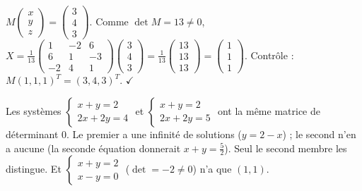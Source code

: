 \begin{exemple}
$M\begin{pmatrix}x\\y\\z\end{pmatrix}=\begin{pmatrix}3\\4\\3\end{pmatrix}$. Comme $\det M=13\ne0$, $X=\frac1{13}\begin{pmatrix}1&-2&6\\6&1&-3\\-2&4&1\end{pmatrix}\begin{pmatrix}3\\4\\3\end{pmatrix}=\frac1{13}\begin{pmatrix}13\\13\\13\end{pmatrix}=\begin{pmatrix}1\\1\\1\end{pmatrix}$. Contrôle : $M(1,1,1)^T=(3,4,3)^T$. $\checkmark$
\end{exemple}
\begin{cas}[trois situations pour $\det A=0$]
Les systèmes $\begin{cases}x+y=2\\2x+2y=4\end{cases}$ et $\begin{cases}x+y=2\\2x+2y=5\end{cases}$ ont la même matrice de déterminant $0$. Le premier a une infinité de solutions ($y=2-x$) ; le second n'en a aucune (la seconde équation donnerait $x+y=\frac52$). Seul le second membre les distingue. Et $\begin{cases}x+y=2\\x-y=0\end{cases}$ ($\det=-2\ne0$) n'a que $(1,1)$.
\end{cas}

